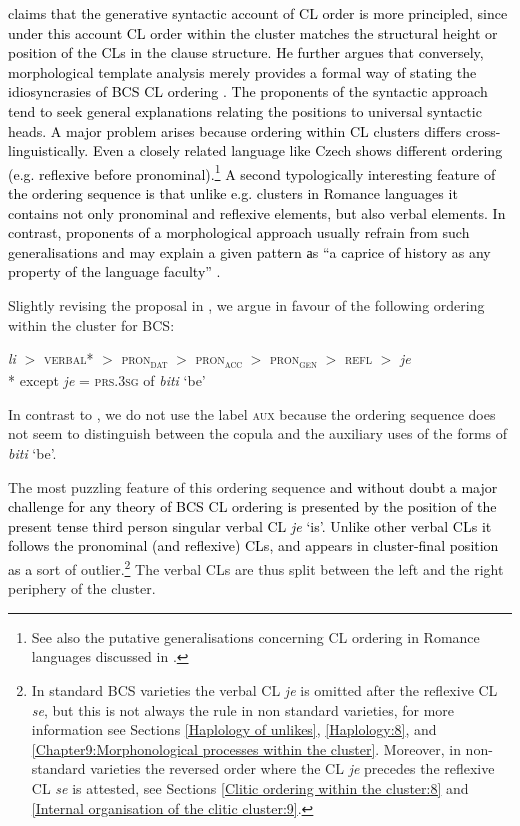 \textcolor{black}{\citet[63]{Boskovic01} claims that the generative syntactic account of CL order is more principled, since under this account CL order within the cluster matches the structural height or position of the CLs in the clause structure. He further argues that conversely, morphological template analysis merely provides a formal way of stating the idiosyncrasies of BCS CL ordering \citep[64]{Boskovic01}.}
\textcolor{black}{The proponents of the syntactic approach tend to seek general explanations relating the positions to universal syntactic heads. 
A major problem arises because ordering within CL clusters differs cross-linguistically. Even a closely related language like Czech shows different ordering (e.g. reflexive before pronominal).\footnote{See also the putative generalisations concerning CL ordering in Romance languages discussed in \citet{HeggieOrdonez05}.}  A second typologically interesting feature of the ordering sequence is that unlike e.g. clusters in Romance languages it contains not only pronominal and reflexive elements, but also verbal elements.
In contrast, proponents of a morphological approach usually refrain from such generalisations and may explain a given pattern аs “a caprice of history as any property of the language faculty” \citep[319]{SpencerLuis12}.}

Slightly revising the proposal in \citet[29]{FranksKing00}, we argue in favour of the following ordering within the cluster for BCS: 

\begin{exe}\sn
\textit{li} ${}>{}$ \textsc{verbal}* ${}>{}$ \textsc{pron\textsubscript{\textsc{dat}}} ${}>{}$ \textsc{pron\textsubscript{\textsc{acc}}} ${}>{}$ \textsc{pron\textsubscript{\textsc{gen}}} ${}>{}$ \textsc{refl} ${}>{}$ \textit{je}\\
* except \textit{je} = \textsc{prs.3sg} of \textit{biti} `be'
\end{exe}

In contrast to \citet{FranksKing00}, we do not use the label \textsc{aux} because the ordering sequence does not seem to distinguish between the copula and the auxiliary uses of the forms of \textit{biti} `be'.


The most puzzling feature of this ordering sequence \textcolor{black}{and without doubt a major challenge for any theory of BCS CL ordering is presented by the position of the present tense third person singular verbal CL \textit{je} ‘is’. Unlike other verbal CLs it follows the pronominal (and reflexive) CLs, and  appears in cluster-final position as a} sort of outlier.\footnote{In standard BCS varieties the verbal CL \textit{je} is omitted after the reflexive CL \textit{se}, but this is not always the rule in non standard varieties, for more information see Sections \ref{Haplology of unlikes}, \ref{Haplology:8}, and \ref{Chapter9:Morphonological processes within the cluster}. Moreover, in non-standard varieties the reversed order where the CL \textit{je} precedes the reflexive CL \textit{se} is attested, see Sections \ref{Clitic ordering within the cluster:8} and \ref{Internal organisation of the clitic cluster:9}.} The verbal CLs are thus split between the left and the right periphery of the cluster.

